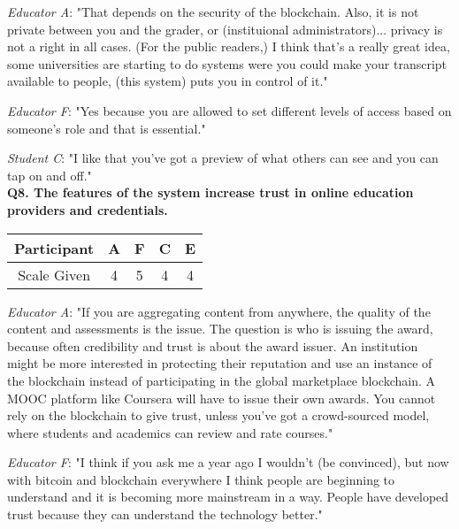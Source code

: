 \textit{Educator A}: "That depends on the security of the blockchain. Also, it is not private between you and
the grader, or (instituional administrators)... privacy is not a right in all cases. (For the public readers,)
I think that's a really great idea, some universities are starting to do systems were you could make your transcript
available to people, (this system) puts you in control of it."

\textit{Educator F}: "Yes because you are allowed to set different levels of access based on someone's role and
that is essential."

\textit{Student C}: "I like that you've got a preview of what others can see and you can tap on and off."\\

\textbf{Q8. The features of the system increase trust in online education providers and credentials.}\\
\begin{table}[!ht]
	\centering
	\begin{tabularx}{0.325\textwidth}{|c|c|c|c|c|}
		\hline
		Participant & A                        & F                  & C                        & E \\
		\hline
		Scale Given & \cellcolor{SpringGreen}4 & \cellcolor{green}5 & \cellcolor{SpringGreen}4 & \cellcolor{SpringGreen}4 \\
		\hline
	\end{tabularx}
\end{table}

\textit{Educator A}: "If you are aggregating content from anywhere,
the quality of the content and assessments is the issue. The question is who is issuing the award,
because often credibility and trust is about the award issuer.
An institution might be more interested in protecting their reputation and use an instance of the blockchain
instead of participating in the global marketplace blockchain. A MOOC platform like Coursera will have to issue
their own awards. You cannot rely on the blockchain to give trust, unless you've got a crowd-sourced model,
where students and academics can review and rate courses."

\textit{Educator F}: "I think if you ask me a year ago I wouldn't (be convinced), but now with bitcoin and
blockchain everywhere I think people are beginning to understand and it is becoming more mainstream in a way.
People have developed trust because they can understand the technology better."

